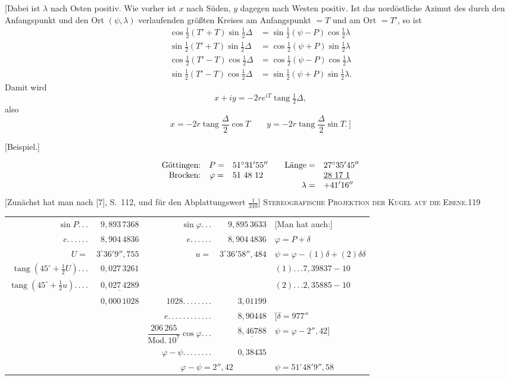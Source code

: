 [Dabei ist $\lambda$ nach Osten positiv. Wie vorher ist $x$ nach Süden, $y$ dagegen nach Westen positiv. Ist das nordöstliche Azimut des durch den Anfangspunkt und den Ort $(\psi,\lambda)$ verlaufenden größten Kreises am Anfangspunkt $=T$ und am Ort $=T'$, so ist
\[
\begin{aligned}
\cos\tfrac12(T'+T)\sin\tfrac12\Delta&=\sin\tfrac12(\psi-P)\cos\tfrac12\lambda\\
\sin\tfrac12(T'+T)\sin\tfrac12\Delta&=\cos\tfrac12(\psi+P)\sin\tfrac12\lambda\\
\cos\tfrac12(T'-T)\cos\tfrac12\Delta&=\cos\tfrac12(\psi-P)\cos\tfrac12\lambda\\
\sin\tfrac12(T'-T)\cos\tfrac12\Delta&=\sin\tfrac12(\psi+P)\sin\tfrac12\lambda.
\end{aligned}
\]
Damit wird
\[
x+iy=-2re^{iT}\operatorname{tang}\tfrac12\Delta,
\]
also
\[
x=-2r\operatorname{tang}\frac\Delta2\cos T\qquad y=-2r\operatorname{tang}\frac\Delta2\sin T.\,]
\]
\begin{center}[Beispiel.]\end{center}
\[
\begin{array}{rcl@{\qquad}rl}
\text{Göttingen:}&P=&51^\circ31'55''&\text{Länge}=&27^\circ35'45''\\
\text{Brocken:}&\varphi=&51\ 48\ 12&&\underline{28\ 17\ 1}\\
&&&\lambda=&+41'16''
\end{array}
\]
[Zunächst hat man nach [7], S.~112, und für den Abplattungswert $\tfrac1{310}$]
\clearpage
\noindent\mbox{}\hfill{\small\textsc{Stereografische Projektion der Kugel auf die Ebene.}}\hfill119\par\medskip
\begin{center}
\begingroup\fontsize{8}{11}\selectfont\setlength{\tabcolsep}{3pt}\renewcommand{\arraystretch}{1.4}
\begin{tabular}{@{}r@{ }r@{\quad}r@{ }r@{\quad}l@{}}
$\sin P.\,.\,.$&$9{,}893\,7368$&$\sin\varphi.\,.\,.$&$9{,}895\,3633$&[Man hat auch:]\\
$e.\,.\,.\,.\,.\,.$&$8{,}904\,4836$&$e.\,.\,.\,.\,.\,.$&$8{,}904\,4836$&$\varphi=P+\delta$\\
$U=$&$3^\circ36'9''{,}755$&$u=$&$3^\circ36'58''{,}484$&$\psi=\varphi-(1)\delta+(2)\delta\delta$\\
$\operatorname{tang}(45^\circ+\tfrac12U).\,.\,.$&$0{,}027\,3261$&&&$(1).\,.\,. 7{,}39837-10$\\
$\operatorname{tang}(45^\circ+\tfrac12u).\,.\,.\,.$&$\underline{0{,}027\,4289}$&&&$(2).\,.\,. 2{,}35885-10$\\
&$0{,}000\,1028$&$1028.\,.\,.\,.\,.\,.\,.\,.$&$3{,}01199$&\\
&&$e.\,.\,.\,.\,.\,.\,.\,.\,.\,.\,.\,.$&$8{,}90448$&$[\delta=977''$\\
&&$\dfrac{206\,265}{\mathrm{Mod.}\,10^7}\cos\varphi.\,.\,.$&$\underline{8{,}46788}$&$\psi=\varphi-2''{,}42]$\\
&&$\varphi-\psi.\,.\,.\,.\,.\,.\,.\,.$&$0{,}38435$&\\
&&\multicolumn{2}{c}{$\varphi-\psi=2''{,}42$}&$\psi=51^\circ48'9''{,}58$
\end{tabular}\par\endgroup
\end{center}
